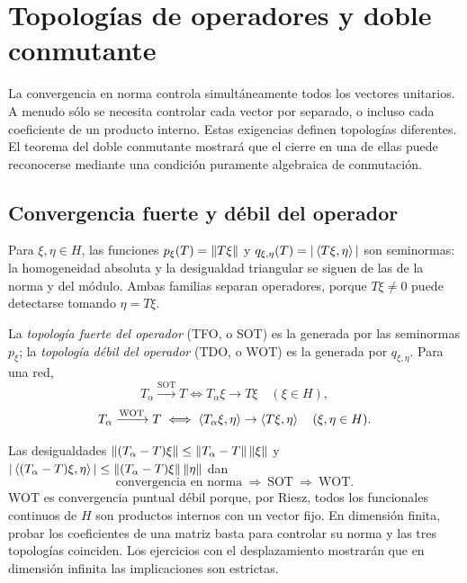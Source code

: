 \chapter{Topologías de operadores y doble conmutante}\label{cap:v3-16}

La convergencia en norma controla simultáneamente todos los vectores unitarios. A menudo sólo se necesita controlar cada vector por separado, o incluso cada coeficiente de un producto interno. Estas exigencias definen topologías diferentes. El teorema del doble conmutante mostrará que el cierre en una de ellas puede reconocerse mediante una condición puramente algebraica de conmutación.

\section{Convergencia fuerte y débil del operador}\label{lec:v3-31}

Para $\xi,\eta\in H$, las funciones $p_\xi(T)=\left\lVert T\xi\right\rVert$ y $q_{\xi,\eta}(T)=|\left\langle T\xi,\eta\right\rangle|$ son seminormas: la homogeneidad absoluta y la desigualdad triangular se siguen de las de la norma y del módulo. Ambas familias separan operadores, porque $T\xi\ne0$ puede detectarse tomando $\eta=T\xi$.

\begin{definicion}
La \emph{topología fuerte del operador} (TFO, o SOT) es la generada por las seminormas $p_\xi$; la \emph{topología débil del operador} (TDO, o WOT) es la generada por $q_{\xi,\eta}$. Para una red,
\[
 T_\alpha\xrightarrow{\mathrm{SOT}}T\iff T_\alpha\xi\to T\xi\quad(\xi\in H),
\]
\[
 T_\alpha\xrightarrow{\mathrm{WOT}}T\iff
 \left\langle T_\alpha\xi,\eta\right\rangle\to\left\langle T\xi,\eta\right\rangle\quad(\xi,\eta\in H).
\]
\end{definicion}

Las desigualdades $\left\lVert(T_\alpha-T)\xi\right\rVert\le\left\lVert T_\alpha-T\right\rVert\left\lVert\xi\right\rVert$ y $|\left\langle(T_\alpha-T)\xi,\eta\right\rangle|\le\left\lVert(T_\alpha-T)\xi\right\rVert\left\lVert\eta\right\rVert$ dan
\[
 \text{convergencia en norma}\ \Longrightarrow\ \text{SOT}\ \Longrightarrow\ \text{WOT}.
\]
WOT es convergencia puntual débil porque, por Riesz, todos los funcionales continuos de $H$ son productos internos con un vector fijo. En dimensión finita, probar los coeficientes de una matriz basta para controlar su norma y las tres topologías coinciden. Los ejercicios con el desplazamiento mostrarán que en dimensión infinita las implicaciones son estrictas.

